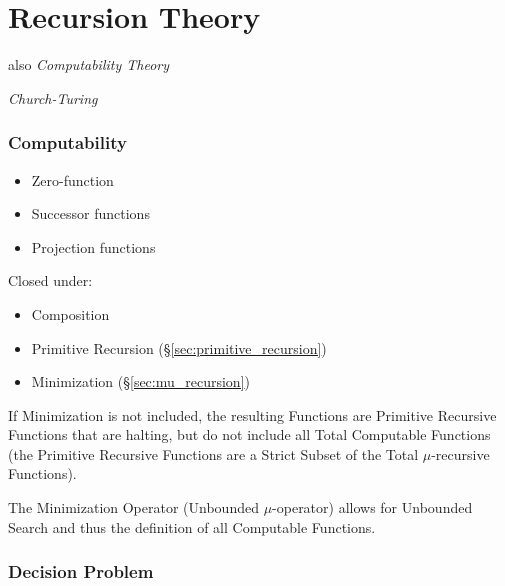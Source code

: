 \part{Recursion Theory}\cite{czoo14}\label{sec:recursion_theory}

also \emph{Computability Theory}

\emph{Church-Turing}



\section{Computability}\label{sec:computability}

\begin{itemize}
\item Zero-function
\item Successor functions
\item Projection functions
\end{itemize}

Closed under:

\begin{itemize}
\item Composition
\item Primitive Recursion (\S\ref{sec:primitive_recursion})
\item Minimization (\S\ref{sec:mu_recursion})
\end{itemize}

If Minimization is not included, the resulting Functions are Primitive
Recursive Functions that are halting, but do not include all Total
Computable Functions (the Primitive Recursive Functions are a Strict
Subset of the Total $\mu$-recursive Functions).

The Minimization Operator (Unbounded $\mu$-operator) allows for
Unbounded Search and thus the definition of all Computable Functions.



\section{Decision Problem}\label{sec:decision_problem}



